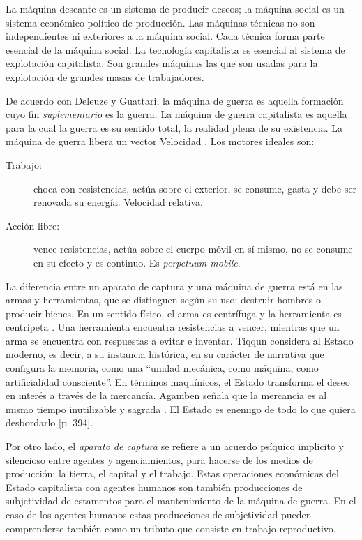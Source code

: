 La máquina deseante es un sistema de producir deseos; la máquina social es un sistema económico-político de producción. Las máquinas técnicas no son independientes ni exteriores a la máquina social. Cada técnica forma parte esencial de la máquina social. La tecnología capitalista es esencial al sistema de explotación capitalista. Son grandes máquinas las que son usadas para la explotación de grandes masas de trabajadores.

De acuerdo con Deleuze y Guattari, la máquina de guerra es aquella formación cuyo fin \emph{suplementario} es la guerra. La máquina de guerra capitalista es aquella para la cual la guerra es su sentido total, la realidad plena de su existencia. La máquina de guerra libera un vector Velocidad \autocite[p. 399]{deleuzeMilMesetasCapitalismo2002}. Los motores ideales son:

\begin{description}
  \item[Trabajo:] choca con resistencias, actúa sobre el exterior, se consume, gasta y debe ser renovada su energía. Velocidad relativa.
  \item[Acción libre:] vence resistencias, actúa sobre el cuerpo móvil en sí mismo, no se consume en su efecto y es continuo. Es \emph{perpetuum mobile}.
\end{description}

La diferencia entre un aparato de captura y una máquina de guerra está en las armas y herramientas, que se distinguen según su uso: destruir hombres o producir bienes. En un sentido físico, el arma es centrífuga y la herramienta es centrípeta \autocite[p. 398]{deleuzeMilMesetasCapitalismo2002}. Una herramienta encuentra resistencias a vencer, mientras que un arma se encuentra con respuestas a evitar e inventar. Tiqqun considera al Estado moderno, es decir, a su instancia histórica, en su carácter de narrativa que configura la memoria, como una ``unidad mecánica, como máquina, como artificialidad consciente''. En términos maquínicos, el Estado transforma el deseo en interés a través de la mercancía. Agamben señala que la mercancía es al mismo tiempo inutilizable y sagrada \autocite{agambenHomoSacer1998}. El Estado es enemigo de todo lo que quiera desbordarlo [p. 394]\autocite{deleuzeMilMesetasCapitalismo2002}.

Por otro lado, el \emph{aparato de captura} se refiere a un acuerdo psíquico implícito y silencioso entre agentes y agenciamientos, para hacerse de los medios de producción: la tierra, el capital y el trabajo. Estas operaciones económicas del Estado capitalista con agentes humanos son también producciones de subjetividad de estamentos para el mantenimiento de la máquina de guerra. En el caso de los agentes humanos estas producciones de subjetividad pueden comprenderse también como un tributo que consiste en trabajo reproductivo.

